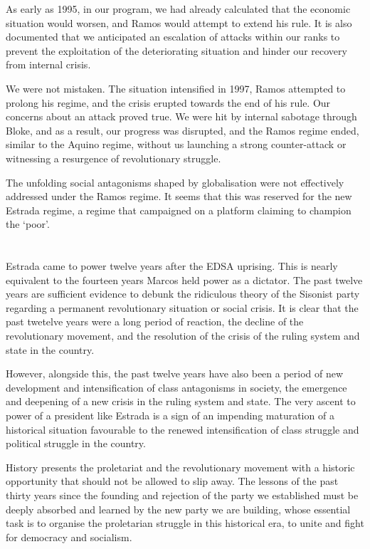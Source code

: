 As early as 1995, in our program, we had already calculated that 
the economic situation would worsen, and Ramos would attempt to extend his rule. 
It is also documented that we anticipated an escalation of attacks 
within our ranks to prevent the exploitation of the deteriorating situation 
and hinder our recovery from internal crisis.

We were not mistaken. The situation intensified in 1997, 
Ramos attempted to prolong his regime, 
and the crisis erupted towards the end of his rule. 
Our concerns about an attack proved true. 
We were hit by internal sabotage through Bloke, 
and as a result, our progress was disrupted, and the Ramos regime ended, 
similar to the Aquino regime, without us launching a strong counter-attack 
or witnessing a resurgence of revolutionary struggle.

The unfolding social antagonisms shaped by globalisation 
were not effectively addressed under the Ramos regime. 
It seems that this was reserved for the new Estrada regime, 
a regime that campaigned on a platform claiming to champion the `poor'.


\section{}
Estrada came to power twelve years after the EDSA uprising. 
This is nearly equivalent to the fourteen years Marcos held power as a dictator.
The past twelve years are sufficient evidence to debunk the ridiculous theory 
of the Sisonist party regarding a permanent revolutionary situation 
or social crisis. 
It is clear that the past twetelve years were a long period of reaction, 
the decline of the revolutionary movement, 
and the resolution of the crisis of the ruling system and state in the country.

However, alongside this, the past twelve years have also been a period 
of new development and intensification of class antagonisms in society, 
the emergence and deepening of a new crisis in the ruling system and state. 
The very ascent to power of a president like Estrada is a sign of 
an impending maturation of a historical situation favourable 
to the renewed intensification of class struggle and political struggle 
in the country.

History presents the proletariat and the revolutionary movement 
with a historic opportunity that should not be allowed to slip away. 
The lessons of the past thirty years since the founding and rejection 
of the party we established must be deeply absorbed and learned by 
the new party we are building, whose essential task is to organise 
the proletarian struggle in this historical era, to unite and fight 
for democracy and socialism.


